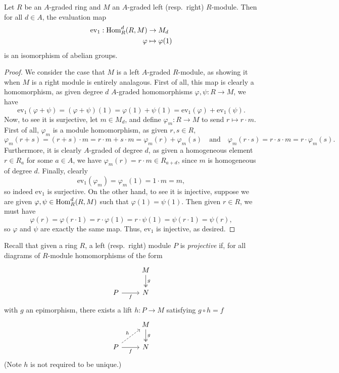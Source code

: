 \documentclass[../main.tex]{subfiles}
\begin{document}
\begin{lemma}\label{ev_at_1_is_iso}
	Let $R$ be an $A$-graded ring and $M$ an $A$-graded left (resp.\ right) $R$-module. Then for all $d\in A$, the evaluation map
	\begin{align*}
		\mathrm{ev_1}:\mathrm{Hom}_{R}^d(R,M)&\to M_d \\
		\varphi&\mapsto\varphi(1)
	\end{align*}
	is an isomorphism of abelian groups.
\end{lemma}
\begin{proof}
	We consider the case that $M$ is a left $A$-graded $R$-module, as showing it when $M$ is a right module is entirely analagous. First of all, this map is clearly a homomorphism, as given degree $d$ $A$-graded homomorphisms $\varphi,\psi:R\to M$, we have 
	\[\mathrm{ev}_1(\varphi+\psi)=(\varphi+\psi)(1)=\varphi(1)+\psi(1)=\mathrm{ev}_1(\varphi)+\mathrm{ev}_1(\psi).\]
	Now, to see it is surjective, let $m\in M_d$, and define $\varphi_m:R\to M$ to send $r\mapsto r\cdot m$. First of all, $\varphi_m$ is a module homomorphism, as given $r,s\in R$, 
	\[\varphi_m(r+s)=(r+s)\cdot m=r\cdot m+s\cdot m=\varphi_m(r)+\varphi_m(s)\quad\text{and}\quad\varphi_m(r\cdot s)=r\cdot s\cdot m=r\cdot\varphi_m(s).\]
	Furthermore, it is clearly $A$-graded of degree $d$, as given a homogeneous element $r\in R_a$ for some $a\in A$, we have $\varphi_m(r)=r\cdot m\in R_{a+d}$, since $m$ is homogeneous of degree $d$. Finally, clearly 
	\[\mathrm{ev}_1(\varphi_m)=\varphi_m(1)=1\cdot m=m,\]
	so indeed $\mathrm{ev}_1$ is surjective. On the other hand, to see it is injective, suppose we are given $\varphi,\psi\in\mathrm{Hom}_R^d(R,M)$ such that $\varphi(1)=\psi(1)$. Then given $r\in R$, we must have
	\[\varphi(r)=\varphi(r\cdot 1)=r\cdot\varphi(1)=r\cdot\psi(1)=\psi(r\cdot 1)=\psi(r),\]
	so $\varphi$ and $\psi$ are exactly the same map. Thus, $\mathrm{ev}_1$ is injective, as desired.
\end{proof}

Recall that given a ring $R$, a left (resp.\ right) module $P$ is \emph{projective} if, for all diagrams of $R$-module homomorphisms of the form
\[\begin{tikzcd}
	& M \\
	P & N
	\arrow["f"', from=2-1, to=2-2]
	\arrow["g", two heads, from=1-2, to=2-2]
\end{tikzcd}\]
with $g$ an epimorphism, there exists a lift $h:P\to M$ satisfying $g\circ h=f$
\[\begin{tikzcd}
	& M \\
	P & N
	\arrow["f"', from=2-1, to=2-2]
	\arrow["g", two heads, from=1-2, to=2-2]
	\arrow["h", dashed, from=2-1, to=1-2]
\end{tikzcd}\]
(Note $h$ is not required to be unique.)
\end{document}
